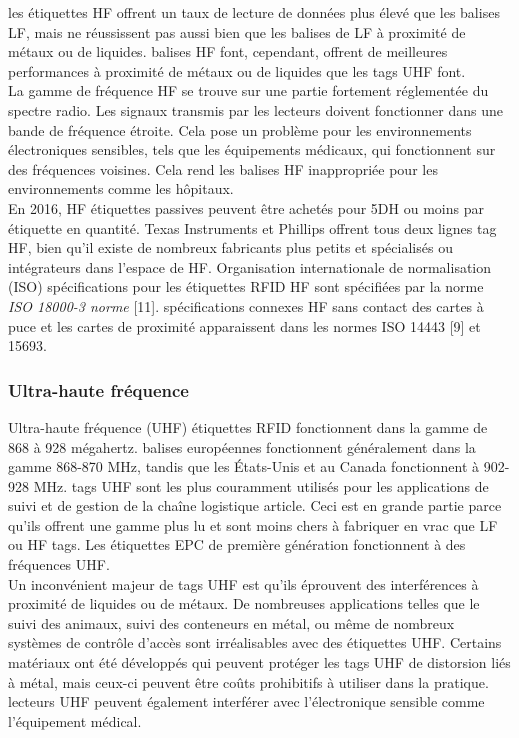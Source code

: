 \documentclass[11pt, a4paper, twoside]{book}
\begin{document}
les étiquettes HF offrent un taux de lecture de données plus élevé que les balises LF, mais ne réussissent pas aussi bien que les balises de LF à proximité de métaux ou de liquides. balises HF font, cependant, offrent de meilleures performances à proximité de métaux ou de liquides que les tags UHF font.\\

La gamme de fréquence HF se trouve sur une partie fortement réglementée du spectre radio. Les signaux transmis par les lecteurs doivent fonctionner dans une bande de fréquence étroite. Cela pose un problème pour les environnements électroniques sensibles, tels que les équipements médicaux, qui fonctionnent sur des fréquences voisines. Cela rend les balises HF inappropriée pour les environnements comme les hôpitaux.\\

En 2016, HF étiquettes passives peuvent être achetés pour 5DH ou moins par étiquette en quantité. Texas Instruments et Phillips offrent tous deux lignes tag HF, bien qu'il existe de nombreux fabricants plus petits et spécialisés ou intégrateurs dans l'espace de HF.
Organisation internationale de normalisation (ISO) spécifications pour les étiquettes RFID HF sont spécifiées par la norme \emph{ISO 18000-3 norme} [11]. spécifications connexes HF sans contact des cartes à puce et les cartes de proximité apparaissent dans les normes ISO 14443 [9] et 15693.
\subsubsection{Ultra-haute fréquence}
Ultra-haute fréquence (UHF) étiquettes RFID fonctionnent dans la gamme de 868 à 928 mégahertz. balises européennes fonctionnent généralement dans la gamme 868-870 MHz, tandis que les États-Unis et au Canada fonctionnent à 902-928 MHz. tags UHF sont les plus couramment utilisés pour les applications de suivi et de gestion de la chaîne logistique article. Ceci est en grande partie parce qu'ils offrent une gamme plus lu et sont moins chers à fabriquer en vrac que LF ou HF tags. Les étiquettes EPC de première génération fonctionnent à des fréquences UHF.\\

Un inconvénient majeur de tags UHF est qu'ils éprouvent des interférences à proximité de liquides ou de métaux. De nombreuses applications telles que le suivi des animaux, suivi des conteneurs en métal, ou même de nombreux systèmes de contrôle d'accès sont irréalisables avec des étiquettes UHF. Certains matériaux ont été développés qui peuvent protéger les tags UHF de distorsion liés à métal, mais ceux-ci peuvent être coûts prohibitifs à utiliser dans la pratique. lecteurs UHF peuvent également interférer avec l'électronique sensible comme l'équipement médical.\\
\end{document}
